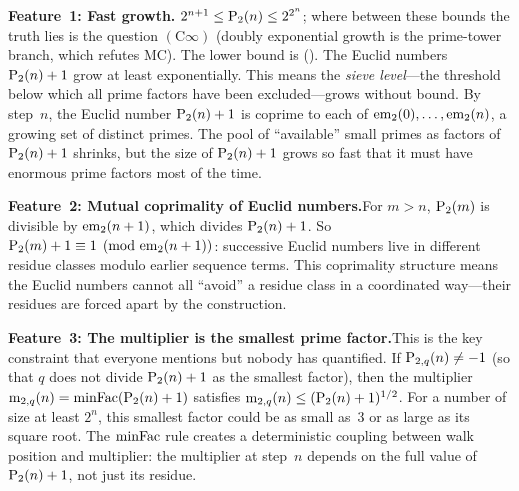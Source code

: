 \medskip\noindent\textbf{Feature~1: Fast growth.}\enspace
$2^{n+1}\le\mathrm{P}_{2}(n) \le 2^{2^n}$; where between these bounds the truth
lies is the question $(\mathrm{C}\infty)$ (doubly exponential growth is the
prime-tower branch, which refutes MC).  The lower bound is
().  The
Euclid numbers $\mathrm{P}_{2}(n)+1$ grow at least exponentially.  This means the
\emph{sieve level}---the threshold below which all prime factors have
been excluded---grows without bound.  By step~$n$, the Euclid
number $\mathrm{P}_{2}(n)+1$ is coprime to each of $\mathrm{em}_{2}(0), \ldots, \mathrm{em}_{2}(n)$,
a growing set of distinct primes.  The pool of ``available'' small
primes as factors of $\mathrm{P}_{2}(n)+1$ shrinks, but the size of
$\mathrm{P}_{2}(n)+1$ grows so fast that it must have enormous prime factors
most of the time.

\medskip\noindent\textbf{Feature~2: Mutual coprimality of Euclid
numbers.}\enspace For $m > n$, $\mathrm{P}_{2}(m)$ is divisible by
$\mathrm{em}_{2}(n+1)$, which divides $\mathrm{P}_{2}(n)+1$.  So
$\mathrm{P}_{2}(m)+1 \equiv 1 \pmod{\mathrm{em}_{2}(n+1)}$: successive Euclid numbers
live in different residue classes modulo earlier sequence terms.  This
coprimality structure means the Euclid numbers cannot all ``avoid'' a
residue class in a coordinated way---their residues are forced apart
by the construction.

\medskip\noindent\textbf{Feature~3: The multiplier is the smallest
prime factor.}\enspace  This is the key constraint that everyone
mentions but nobody has quantified.  If $\mathrm{P}_{2,q}(n) \neq -1$ (so
that $q$ does not divide $\mathrm{P}_{2}(n)+1$ as the smallest factor), then
the multiplier $\mathrm{m}_{2,q}(n) = \mathrm{minFac}(\mathrm{P}_{2}(n)+1)$ satisfies
$\mathrm{m}_{2,q}(n) \leq (\mathrm{P}_{2}(n)+1)^{1/2}$.  For a number of size at least
$2^n$, this smallest factor could be as small as~$3$ or as
large as its square root.  The $\mathrm{minFac}$ rule creates a deterministic
coupling between walk position and multiplier: the multiplier at
step~$n$ depends on the full value of~$\mathrm{P}_{2}(n)+1$, not just its
residue.

